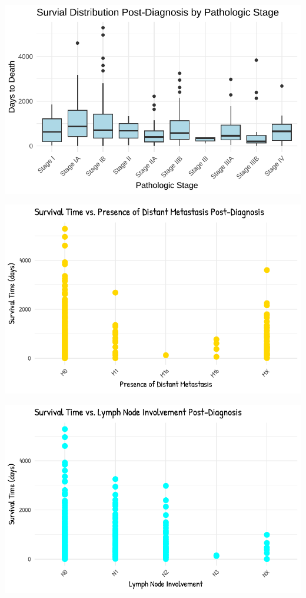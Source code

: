 \documentclass[
  letterpaper,
  DIV=11,
  numbers=noendperiod]{scrartcl}
\begin{document}
\includegraphics{paper_files/figure-pdf/unnamed-chunk-4-5.pdf}

\includegraphics{paper_files/figure-pdf/unnamed-chunk-4-6.pdf}

\includegraphics{paper_files/figure-pdf/unnamed-chunk-4-7.pdf}
\end{document}
